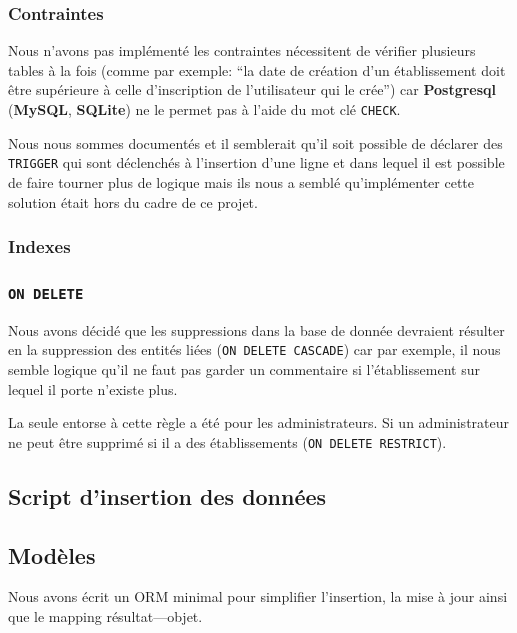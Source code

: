\documentclass[10pt,a4paper]{article}
\begin{document}
\subsubsection{Contraintes}

Nous n'avons pas implémenté les contraintes nécessitent de vérifier plusieurs tables à la fois (comme par exemple: ``la date de création d'un établissement doit être supérieure à celle d'inscription de l'utilisateur qui le crée'') car \textbf{Postgresql} (\textbf{MySQL}, \textbf{SQLite}) ne le permet pas à l'aide du mot clé \texttt{CHECK}.

Nous nous sommes documentés et il semblerait qu'il soit possible de déclarer des \texttt{TRIGGER} qui sont déclenchés à l'insertion d'une ligne et dans lequel il est possible de faire tourner plus de logique mais ils nous a semblé qu'implémenter cette solution était hors du cadre de ce projet.

\subsubsection{Indexes}



\subsubsection{\texttt{ON DELETE}}

Nous avons décidé que les suppressions dans la base de donnée devraient résulter en la suppression des entités liées (\texttt{ON DELETE CASCADE}) car par exemple, il nous semble logique qu'il ne faut pas garder un commentaire si l'établissement sur lequel il porte n'existe plus.

La seule entorse à cette règle a été pour les administrateurs. Si un administrateur ne peut être supprimé si il a des établissements (\texttt{ON DELETE RESTRICT}).

\subsection{Script d'insertion des données}

\subsection{Modèles}

Nous avons écrit un ORM minimal pour simplifier l'insertion, la mise à jour ainsi que le mapping résultat---objet.
\end{document}
